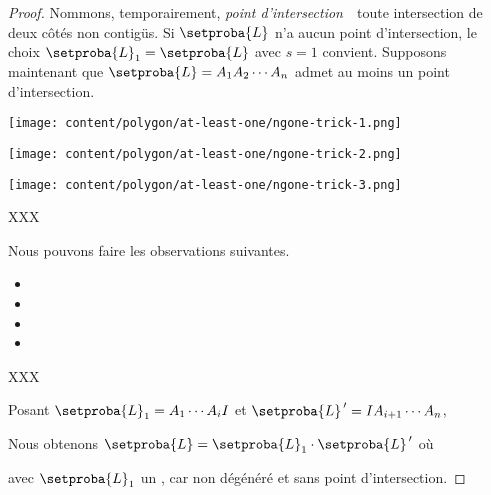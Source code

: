\begin{proof}
	Nommons, temporairement, \og \emph{point d'intersection} \fg\ toute intersection de deux côtés non contigüs.
	Si $\setproba{L}$ n'a aucun point d'intersection,
	le choix $\setproba{L}_1 = \setproba{L}$ avec $s = 1$ convient.
	Supposons maintenant que $\setproba{L} = A_1 A_2 \cdots A_n$ admet au moins un point d'intersection.

	\begin{center}
		\texttt{[image: content/polygon/at-least-one/ngone-trick-1.png]}

		\texttt{[image: content/polygon/at-least-one/ngone-trick-2.png]}

		\texttt{[image: content/polygon/at-least-one/ngone-trick-3.png]}
	\end{center}


    XXX
    
    Nous pouvons faire les observations suivantes.
    \begin{itemize}
    	\item 

    	\item 

    	\item 

    	\item 
    \end{itemize}
	
	
	
	 
    XXX
    
   
	Posant
	$\setproba{L}_1 = A_1 \cdots A_i I$
    et
    $\setproba{L}^{\,\prime} = I A_{i+1} \cdots A_n$,
    
    \smallskip
    
    Nous obtenons $\setproba{L} = \setproba{L}_1 \cdot \setproba{L}^{\,\prime}$ où

    avec $\setproba{L}_1$ un \ngone, car non dégénéré et sans point d'intersection.
    
    
    
\end{proof}









